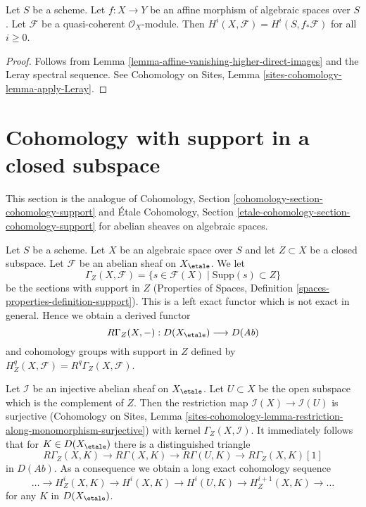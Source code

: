 \begin{lemma}
\label{lemma-relative-affine-cohomology}
Let $S$ be a scheme. Let $f : X \to Y$ be an affine
morphism of algebraic spaces over $S$.
Let $\mathcal{F}$ be a quasi-coherent $\mathcal{O}_X$-module.
Then $H^i(X, \mathcal{F}) = H^i(S, f_*\mathcal{F})$ for all $i \geq 0$.
\end{lemma}

\begin{proof}
Follows from Lemma \ref{lemma-affine-vanishing-higher-direct-images}
and the Leray spectral sequence. See
Cohomology on Sites, Lemma \ref{sites-cohomology-lemma-apply-Leray}.
\end{proof}






\section{Cohomology with support in a closed subspace}
\label{section-cohomology-support}

\noindent
This section is the analogue of Cohomology, Section
\ref{cohomology-section-cohomology-support}
and \'Etale Cohomology, Section
\ref{etale-cohomology-section-cohomology-support}
for abelian sheaves on algebraic spaces.

\medskip\noindent
Let $S$ be a scheme.
Let $X$ be an algebraic space over $S$ and let $Z \subset X$ be a closed
subspace. Let $\mathcal{F}$ be an abelian sheaf on $X_\etale$. We let
$$
\Gamma_Z(X, \mathcal{F}) =
\{s \in \mathcal{F}(X) \mid \text{Supp}(s) \subset Z\}
$$
be the sections with support in $Z$
(Properties of Spaces, Definition \ref{spaces-properties-definition-support}).
This is a left exact functor which is not exact in general.
Hence we obtain a derived functor
$$
R\Gamma_Z(X, -) : D(X_\etale) \longrightarrow D(\textit{Ab})
$$
and cohomology groups with support in $Z$ defined by
$H^q_Z(X, \mathcal{F}) = R^q\Gamma_Z(X, \mathcal{F})$.

\medskip\noindent
Let $\mathcal{I}$ be an injective abelian sheaf on $X_\etale$. Let
$U \subset X$ be the open subspace which is the complement of $Z$.
Then the restriction map $\mathcal{I}(X) \to \mathcal{I}(U)$ is surjective
(Cohomology on Sites, Lemma
\ref{sites-cohomology-lemma-restriction-along-monomorphism-surjective})
with kernel $\Gamma_Z(X, \mathcal{I})$. It immediately follows that
for $K \in D(X_\etale)$ there is a distinguished triangle
$$
R\Gamma_Z(X, K) \to R\Gamma(X, K) \to R\Gamma(U, K) \to R\Gamma_Z(X, K)[1]
$$
in $D(\textit{Ab})$. As a consequence we obtain a long exact cohomology
sequence
$$
\ldots \to H^i_Z(X, K) \to H^i(X, K) \to H^i(U, K) \to
H^{i + 1}_Z(X, K) \to \ldots
$$
for any $K$ in $D(X_\etale)$.

